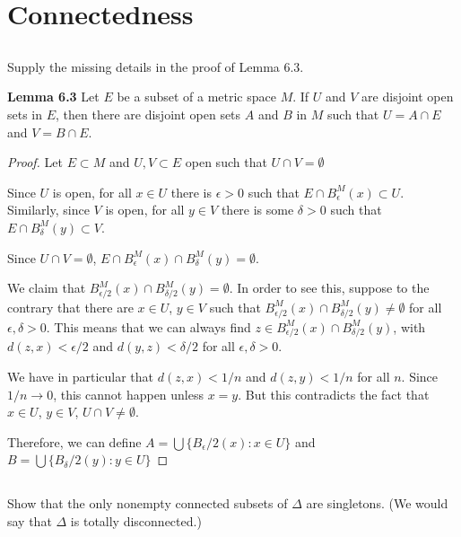 \section{Connectedness}

\subsection{} Supply the missing details in the proof of Lemma 6.3.

\textbf{Lemma 6.3} Let $E$ be a subset of a metric space $M$. If $U$ and $V$ are disjoint open sets in $E$, then there are disjoint open sets $A$ and $B$ in $M$ such that $U = A \cap E$ and $V = B \cap E$. 

\begin{proof}
Let $E \subset M$ and $U,V \subset E$ open such that $U \cap V = \emptyset$

Since $U$ is open, for all $x \in U$ there is $\epsilon>0$ such that $E \cap B^M_\epsilon(x) \subset U$. Similarly, since $V$ is open, for all $y \in V$ there is some $\delta > 0$ such that $E \cap B^M_\delta(y) \subset V$.

Since $U \cap V = \emptyset$, $E \cap B^M_\epsilon(x) \cap B^M_\delta(y) = \emptyset$.

We claim that $B^M_{\epsilon/2}(x) \cap B^M_{\delta/2}(y) = \emptyset$.
In order to see this, suppose to the contrary that there are $x\in U$, $y\in V$ such that $B^M_{\epsilon/2}(x) \cap B^M_{\delta/2}(y) \neq \emptyset$ for all $\epsilon,\delta>0$. This means that we can always find $z \in B^M_{\epsilon/2}(x) \cap B^M_{\delta/2}(y)$, with $d(z,x) < \epsilon/2$ and $d(y,z) < \delta/2$ for all $\epsilon,\delta>0$.

We have in particular that $d(z,x) < 1/n$ and $d(z,y)<1/n$ for all $n$. Since $1/n \rightarrow 0$, this cannot happen unless $x=y$. But this contradicts the fact that $x\in U$, $y \in V$, $U\cap V \neq \emptyset$.

Therefore, we can define $A = \bigcup\{B_\epsilon/2(x) : x \in U\}$ and $B = \bigcup\{B_\delta/2(y) : y \in U\}$

\end{proof}

\subsection{} Show that the only nonempty connected subsets of $\Delta$ are singletons. (We would say that $\Delta$ is totally disconnected.)

